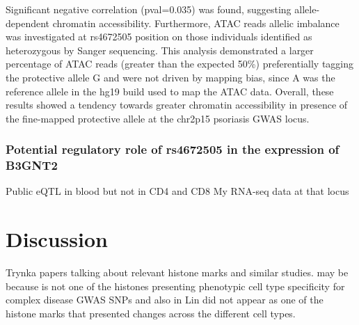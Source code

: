 Significant negative correlation (pval=0.035) was found, suggesting allele-dependent chromatin accessibility. Furthermore, ATAC reads allelic imbalance was investigated at rs4672505 position on those individuals identified as heterozygous by Sanger sequencing. This analysis demonstrated a larger percentage of ATAC reads (greater than the expected 50\%) preferentially tagging the protective allele G and were not driven by mapping bias, since A was the reference allele in the hg19 build used to map the ATAC data. Overall, these results showed a tendency towards greater chromatin accessibility in presence of the fine-mapped protective allele at the chr2p15 psoriasis GWAS locus.
 

\subsubsection{Potential regulatory role of rs4672505 in the expression of B3GNT2}

Public eQTL in blood but not in CD4 and CD8
My RNA-seq data at that locus



\section{Discussion}

Trynka papers talking about relevant histone marks and similar studies. may be because is not one of the histones presenting phenotypic cell type specificity for complex disease GWAS SNPs and also in Lin did not appear as one of the histone marks that presented changes across the different cell types.



